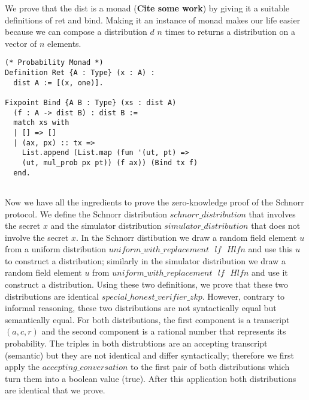 \documentclass[conference,compsoc]{IEEEtran}
\begin{document}
We prove that the dist is a monad (\textbf{Cite some work}) by 
giving it a suitable definitions of ret and bind. Making 
it an instance of monad makes our life easier because 
we can compose a distribution $d$ $n$ times to 
returns a distribution on a vector of $n$ elements. 


    
\begin{lstlisting}[frame=single, language=Coq, caption={Definition of Natural Number},
  label={ind_nat},captionpos=t, basicstyle=\ttfamily\footnotesize,
  abovecaptionskip=-\medskipamount]
(* Probability Monad *)
Definition Ret {A : Type} (x : A) : 
  dist A := [(x, one)].

Fixpoint Bind {A B : Type} (xs : dist A)  
  (f : A -> dist B) : dist B := 
  match xs with 
  | [] => [] 
  | (ax, px) :: tx => 
    List.append (List.map (fun '(ut, pt) => 
    (ut, mul_prob px pt)) (f ax)) (Bind tx f)
  end.


\end{lstlisting}

  
Now we have all the ingredients to prove the zero-knowledge 
proof of the Schnorr protocol. We define the 
Schnorr distribution $schnorr\_distribution$
that involves the secret $x$ and 
the simulator distribution $simulator\_distribution$
that does not involve the secret $x$. 
In the Schnorr distibution we draw 
a random field element $u$ from a uniform 
distribution $uniform\_with\_replacement \text{ }lf \text{ } Hlfn$
and use this $u$ to construct a distribution; 
similarly in the simulator distribution 
we draw a random field element $u$ from 
$uniform\_with\_replacement \text{ }lf \text{ } Hlfn$
and use it construct a distribution. Using these 
two definitions, we prove that these two 
distributions are identical 
$special\_honest\_verifier\_zkp$. However, 
contrary to informal reasoning, these two 
distributions are not syntactically equal but 
semantically equal. For both distributions, 
the first component is a transcript $(a, c, r)$ and 
the second component is a rational number that represents 
its probability. The triples in both distrubtions 
are an accepting transcript (semantic) but they 
are not identical and differ syntactically; 
therefore we first apply the 
$accepting\_conversation$ to the first pair of 
both distributions which turn them into 
a boolean value (true). After this  
application both distributions are identical 
that we prove. 
\end{document}
